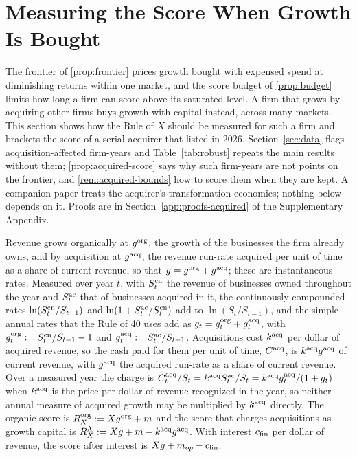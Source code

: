 \section{Measuring the Score When Growth Is Bought}\label{sec:acquired-growth}

The frontier of \autoref{prop:frontier} prices growth bought with expensed spend at diminishing returns within one market, and the score budget of \autoref{prop:budget} limits how long a firm can score above its saturated level. A firm that grows by acquiring other firms buys growth with capital instead, across many markets. This section shows how the Rule of $X$ should be measured for such a firm and brackets the score of a serial acquirer that listed in 2026. Section~\ref{sec:data} flags acquisition-affected firm-years and Table~\ref{tab:robust} repeats the main results without them; \autoref{prop:acquired-score} says why such firm-years are not points on the frontier, and \autoref{rem:acquired-bounds} how to score them when they are kept. A companion paper \citep{murthy2026transformation} treats the acquirer's transformation economics; nothing below depends on it. Proofs are in Section~\ref{app:proofs-acquired} of the Supplementary Appendix.

\begin{definition}\label{def:acquired-growth}
Revenue grows organically at $g^{\rm org}$, the growth of the businesses the firm already owns, and by acquisition at $g^{\rm acq}$, the revenue run-rate acquired per unit of time as a share of current revenue, so that $g=g^{\rm org}+g^{\rm acq}$; these are instantaneous rates. Measured over year $t$, with $S^{\rm cn}_t$ the revenue of businesses owned throughout the year and $S^{\rm ac}_t$ that of businesses acquired in it, the continuously compounded rates $\ln(S^{\rm cn}_t/S_{t-1})$ and $\ln(1+S^{\rm ac}_t/S^{\rm cn}_t)$ add to $\ln(S_t/S_{t-1})$, and the simple annual rates that the Rule of 40 uses add as $g_t=g^{\rm org}_t+g^{\rm acq}_t$, with $g^{\rm org}_t:=S^{\rm cn}_t/S_{t-1}-1$ and $g^{\rm acq}_t:=S^{\rm ac}_t/S_{t-1}$. Acquisitions cost $k^{\rm acq}$ per dollar of acquired revenue, so the cash paid for them per unit of time, $C^{\rm acq}$, is $k^{\rm acq}g^{\rm acq}$ of current revenue, with $g^{\rm acq}$ the acquired run-rate as a share of current revenue. Over a measured year the charge is $C^{\rm acq}_t/S_t=k^{\rm acq}S^{\rm ac}_t/S_t=k^{\rm acq}g^{\rm acq}_t/(1+g_t)$ when $k^{\rm acq}$ is the price per dollar of revenue recognized in the year, so neither annual measure of acquired growth may be multiplied by $k^{\rm acq}$ directly. The organic score is $R^{\rm org}_X:=Xg^{\rm org}+m$ and the score that charges acquisitions as growth capital is $R^{\rm A}_X:=Xg+m-k^{\rm acq}g^{\rm acq}$. With interest $c_{\rm fin}$ per dollar of revenue, the score after interest is $Xg+m_{op}-c_{\rm fin}$.
\end{definition}

